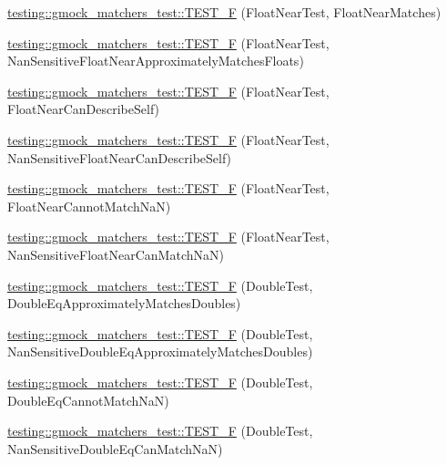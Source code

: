 \begin{DoxyCompactItemize}
\hyperlink{namespacetesting_1_1gmock__matchers__test_a6897409da5003f20f891d8a5ecabdc99}{testing\+::gmock\+\_\+matchers\+\_\+test\+::\+T\+E\+S\+T\+\_\+F} (Float\+Near\+Test, Float\+Near\+Matches)
\item 
\hyperlink{namespacetesting_1_1gmock__matchers__test_ad396e996ed685fd80cbd78740b8d01a8}{testing\+::gmock\+\_\+matchers\+\_\+test\+::\+T\+E\+S\+T\+\_\+F} (Float\+Near\+Test, Nan\+Sensitive\+Float\+Near\+Approximately\+Matches\+Floats)
\item 
\hyperlink{namespacetesting_1_1gmock__matchers__test_ad56232046efe7b4d5169a15fd15a2001}{testing\+::gmock\+\_\+matchers\+\_\+test\+::\+T\+E\+S\+T\+\_\+F} (Float\+Near\+Test, Float\+Near\+Can\+Describe\+Self)
\item 
\hyperlink{namespacetesting_1_1gmock__matchers__test_a4e90d53ea578d6b767559d8615a4c0c2}{testing\+::gmock\+\_\+matchers\+\_\+test\+::\+T\+E\+S\+T\+\_\+F} (Float\+Near\+Test, Nan\+Sensitive\+Float\+Near\+Can\+Describe\+Self)
\item 
\hyperlink{namespacetesting_1_1gmock__matchers__test_a2cd2ceebefa14a5d564a3bca60ed6572}{testing\+::gmock\+\_\+matchers\+\_\+test\+::\+T\+E\+S\+T\+\_\+F} (Float\+Near\+Test, Float\+Near\+Cannot\+Match\+NaN)
\item 
\hyperlink{namespacetesting_1_1gmock__matchers__test_ae7521865828fba53b45cc2819bec1273}{testing\+::gmock\+\_\+matchers\+\_\+test\+::\+T\+E\+S\+T\+\_\+F} (Float\+Near\+Test, Nan\+Sensitive\+Float\+Near\+Can\+Match\+NaN)
\item 
\hyperlink{namespacetesting_1_1gmock__matchers__test_a1b33dc485faca8c69184f3feb0476290}{testing\+::gmock\+\_\+matchers\+\_\+test\+::\+T\+E\+S\+T\+\_\+F} (Double\+Test, Double\+Eq\+Approximately\+Matches\+Doubles)
\item 
\hyperlink{namespacetesting_1_1gmock__matchers__test_ab100ee4a4b0340e31212fb43c9e28255}{testing\+::gmock\+\_\+matchers\+\_\+test\+::\+T\+E\+S\+T\+\_\+F} (Double\+Test, Nan\+Sensitive\+Double\+Eq\+Approximately\+Matches\+Doubles)
\item 
\hyperlink{namespacetesting_1_1gmock__matchers__test_a4c34f3f339de72d3f4f96a08a5125b59}{testing\+::gmock\+\_\+matchers\+\_\+test\+::\+T\+E\+S\+T\+\_\+F} (Double\+Test, Double\+Eq\+Cannot\+Match\+NaN)
\item 
\hyperlink{namespacetesting_1_1gmock__matchers__test_ab42c199ae0008ce7550f584742caec28}{testing\+::gmock\+\_\+matchers\+\_\+test\+::\+T\+E\+S\+T\+\_\+F} (Double\+Test, Nan\+Sensitive\+Double\+Eq\+Can\+Match\+NaN)
\item 

\end{DoxyCompactItemize}

